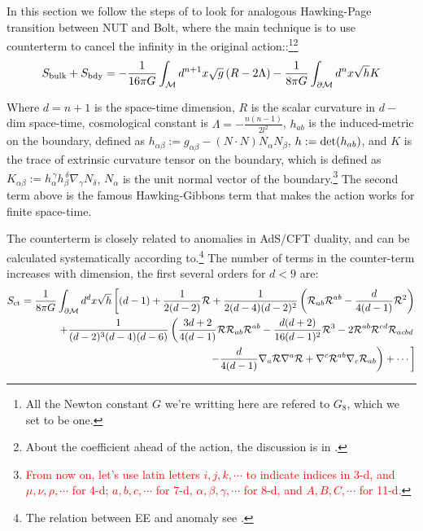 \documentclass[12pt, a4paper]{article}
\numberwithin{equation}{section}
\newcommand{\be}{\begin{equation}}
\newcommand{\ee}{\end{equation}}
\newcommand{\cR}{\mathcal{R}}
\newcommand{\cM}{\mathcal{M}}
\begin{document}
	In this section we follow the steps of \cite{Bobev:2016sh} to look for analogous Hawking-Page transition between NUT and Bolt, where the main technique is to use counterterm to cancel the infinity in the original action:\cite{Bobev:2016sh}\cite{Emparan:1999ac}\cite{Mann:1999se}:\footnote{All the Newton constant $G$ we're writting here are refered to $G_8$, which we set to be one.}\footnote{About the coefficient ahead of the action, the discussion is in \cite{Robinson:2006sd}.}
\be
	S_{\rm bulk} + S_{\rm bdy}= -\frac{1}{16\pi G}\int_{\cM} d^{n+1}x\sqrt{g}\left(R -2\Lambda\right) - \frac{1}{8\pi G}\int_{\partial\cM} d^n x\sqrt{h}K
\ee

	Where $d = n+1$ is the space-time dimension, $R$ is the scalar curvature in $d-$dim space-time, cosmological constant is $\Lambda = -\frac{n(n-1)}{2l^2}$, $h_{ab}$ is the induced-metric on the boundary, defined as $h_{\alpha\beta} := g_{\alpha\beta}-(N\cdot N) N_{\alpha}N_\beta$, $h:= {\rm det}(h_{ab})$, and $K$ is the trace of extrinsic curvature tensor on the boundary, which is defined as $K_{\alpha\beta}:=h_\alpha^{\,\gamma}h_{\beta}^{\,\delta}\nabla_\gamma N_\delta$,  $N_\alpha$ is the unit normal vector of the boundary.\cite{Blau:2019gr}\footnote{{\textcolor{red}{From now on, let's use latin letters $i,j,k,\cdots$ to indicate indices in 3-d, and $\mu,\nu,\rho,\cdots$ for 4-d; $a,b,c,\cdots$ for 7-d, $\alpha,\beta,\gamma,\cdots$ for 8-d, and $A,B,C,\cdots$ for 11-d.}}} The second term above is the famous Hawking-Gibbons term that makes the action works for finite space-time.\cite{Hawking:1977qg} 
	
	The counterterm is closely related to anomalies in AdS/CFT duality\cite{Papadimitriou:2016hr}, and can be calculated systematically according to\cite{Henningson:1998wa}.\footnote{The relation between EE and anomaly see \cite{Hughes:2015ai}.} The number of terms in the counter-term increases with dimension, the first several orders for $d<9$ are:\cite{Emparan:1999ac}\cite{Bobev:2016sh}\cite{Clarkson:2002}
\be
\begin{aligned}
		S_{\rm ct} = \frac{1}{8\pi G} \int_{\partial \cM} d^d x\sqrt{h}\left[(d-1) + \frac{1}{2(d-2)}\cR + \frac{1}{2(d-4)(d-2)^2}\left(\cR_{ab}\cR^{ab}-\frac{d}{4(d-1)}\cR^2\right)\right.\\
\left.		+\frac{1}{(d-2)^3(d-4)(d-6)}\left(\frac{3d+2}{4(d-1)}\cR \cR_{ab}\cR^{ab}-\frac{d(d+2)}{16(d-1)^2}\cR^3 - 2\cR^{ab}\cR^{cd}\cR_{acbd}\right.\right.\\ \left.\left.-\frac{d}{4(d-1)}\nabla_a\cR\nabla^a \cR +\nabla^c\cR^{ab}\nabla_c\cR_{ab}\right) + \cdots\right]
\end{aligned}
\ee
\end{document}
